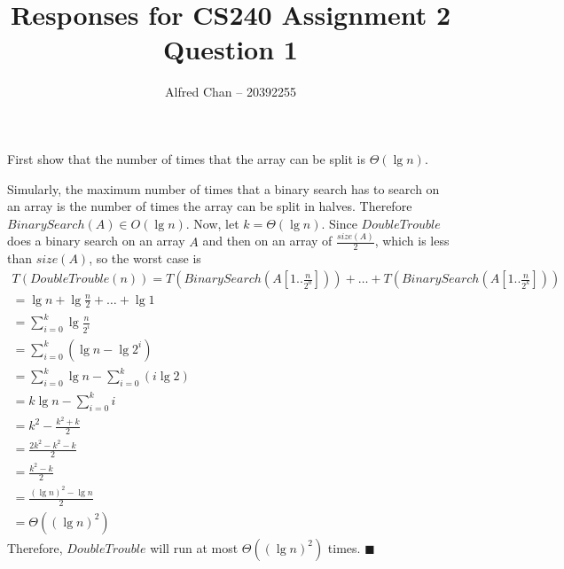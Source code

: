\documentclass[12pt]{article}
\title{Responses for CS240 Assignment 2 Question 1}
\author{Alfred Chan -- 20392255}
\begin{document}
\maketitle
First show that the number of times that the array can be split is $\Theta(\lg n)$.

Simularly, the maximum number of times that a binary search has to search on an array is the number of times the array can be split in halves.
Therefore $BinarySearch(A) \in O(\lg n)$.
Now, let $k = \Theta(\lg n)$.
Since $DoubleTrouble$ does a binary search on an array $A$ and then on an array of $\frac{size(A)}{2}$, which is less than $size(A)$, so the worst case is
\begin{gather*}
T(DoubleTrouble(n)) = T(BinarySearch(A[1..\frac{n}{2^0}])) + \dots + T(BinarySearch(A[1 .. \frac{n}{2^k}]))\\
	= \lg n + \lg\frac{n}{2} + \dots + \lg 1\\
	= \sum_{i=0}^{k} \lg \frac{n}{2^i}\\
	= \sum_{i=0}^{k} (\lg n - \lg 2^{i})\\
	= \sum_{i=0}^{k} \lg n - \sum_{i=0}^{k} (i \lg 2)\\
	= k\lg n - \sum_{i=0}^{k} i\\
	= k^2 - \frac{k^2 + k}{2}\\
	= \frac{2k^2 - k^2 - k}{2}\\
	= \frac{k^2 - k}{2}\\
	= \frac{(\lg n)^2 - \lg n}{2}\\
	= \Theta((\lg n)^2)
\end{gather*}
Therefore, $DoubleTrouble$ will run at most $\Theta((\lg n)^2)$ times.
\hfill $\blacksquare$
\end{document}
